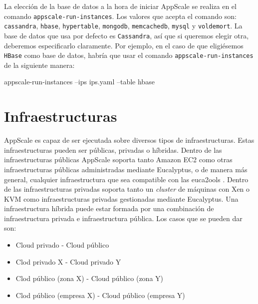 La elección de la base de datos a la hora de iniciar AppScale se realiza en el comando \texttt{appscale-run-instances}. Los valores que acepta el comando son: \texttt{cassandra}, \texttt{hbase}, \texttt{hypertable}, \texttt{mongodb}, \texttt{memcachedb}, \texttt{mysql} y \texttt{voldemort}. La base de datos que usa por defecto es \texttt{Cassandra}, así que si queremos elegir otra, deberemos especificarlo claramente. Por ejemplo, en el caso de que eligiésemos \texttt{HBase} como base de datos, habría que usar el comando \texttt{appscale-run-instances} de la siguiente manera:

\begin{bashcode}
appscale-run-instances --ips ips.yaml --table hbase
\end{bashcode}


\section{Infraestructuras}

AppScale es capaz de ser ejecutada sobre diversos tipos de infraestructuras. Estas infraestructuras pueden ser públicas, privadas o híbridas. Dentro de las infraestructuras públicas AppScale soporta tanto Amazon EC2 como otras infraestructuras públicas administradas mediante Eucalyptus, o de manera más general, cualquier infraestructura que sea compatible con las euca2ools \cite{appscale-euca2ools}. Dentro de las infraestructuras privadas soporta tanto un \emph{cluster} de máquinas con Xen o KVM como infraestructuras privadas gestionadas mediante Eucalyptus. Una infraestructura híbrida puede estar formada por una combinación de infraestructura privada e infraestructura pública. Los casos que se pueden dar son:

\begin{itemize}
\item Cloud privado - Cloud público
\item Clod privado X - Cloud privado Y
\item Clod público (zona X) - Cloud público (zona Y)
\item Clod público (empresa X) - Cloud público (empresa Y)
\end{itemize}
